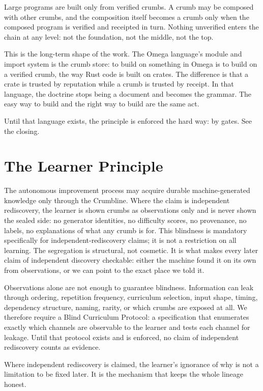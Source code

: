 \documentclass[11pt]{article}
\begin{document}
Large programs are built only from verified crumbs. A crumb may be composed with other crumbs, and the composition itself becomes a crumb only when the composed program is verified and receipted in turn. Nothing unverified enters the chain at any level: not the foundation, not the middle, not the top.

This is the long-term shape of the work. The Omega language's module and import system is the crumb store: to build on something in Omega is to build on a verified crumb, the way Rust code is built on crates. The difference is that a crate is trusted by reputation while a crumb is trusted by receipt. In that language, the doctrine stops being a document and becomes the grammar. The easy way to build and the right way to build are the same act.

Until that language exists, the principle is enforced the hard way: by gates. See the closing.

\section{The Learner Principle}

The autonomous improvement process may acquire durable machine-generated knowledge only through the Crumbline. Where the claim is independent rediscovery, the learner is shown crumbs as observations only and is never shown the sealed side: no generator identities, no difficulty scores, no provenance, no labels, no explanations of what any crumb is for. This blindness is mandatory specifically for independent-rediscovery claims; it is not a restriction on all learning. The segregation is structural, not cosmetic. It is what makes every later claim of independent discovery checkable: either the machine found it on its own from observations, or we can point to the exact place we told it.

Observations alone are not enough to guarantee blindness. Information can leak through ordering, repetition frequency, curriculum selection, input shape, timing, dependency structure, naming, rarity, or which crumbs are exposed at all. We therefore require a Blind Curriculum Protocol: a specification that enumerates exactly which channels are observable to the learner and tests each channel for leakage. Until that protocol exists and is enforced, no claim of independent rediscovery counts as evidence.

Where independent rediscovery is claimed, the learner's ignorance of why is not a limitation to be fixed later. It is the mechanism that keeps the whole lineage honest.
\end{document}
